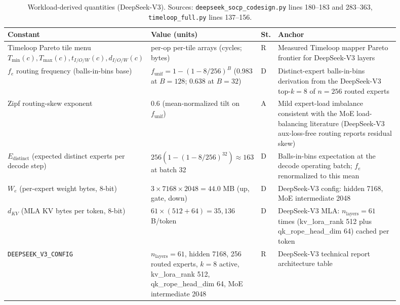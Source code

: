 \begin{table}[h]
\centering
\footnotesize
\begin{tabular}{@{}p{0.26\linewidth}p{0.17\linewidth}p{0.045\linewidth}p{0.42\linewidth}@{}}
\toprule
Constant & Value (units) & St. & Anchor \\
\midrule
Timeloop Pareto tile menu $T_{\min}(c), T_{\max}(c), t_{I/O/W}(c), d_{I/O/W}(c)$ & per-op per-tile arrays (cycles; bytes) & R & Measured Timeloop mapper Pareto frontier for DeepSeek-V3 layers \citep{timeloop} \\
$f_e$ routing frequency (balls-in-bins base) & $f_{\mathrm{unif}} = 1-(1-8/256)^{B}$ (0.983 at $B{=}128$; 0.638 at $B{=}32$) & D & Distinct-expert balls-in-bins derivation from the DeepSeek-V3 top-$k{=}8$ of $n{=}256$ routed experts \citep{deepseekv3report} \\
Zipf routing-skew exponent & 0.6 (mean-normalized tilt on $f_{\mathrm{unif}}$) & A & Mild expert-load imbalance consistent with the MoE load-balancing literature (DeepSeek-V3 aux-loss-free routing reports residual skew) \citep{deepseekv3report} \\
$E_{\mathrm{distinct}}$ (expected distinct experts per decode step) & $256(1-(1-8/256)^{32}) \approx 163$ at batch 32 & D & Balls-in-bins expectation at the decode operating batch; $f_e$ renormalized to this mean \citep{deepseekv3report} \\
$W_e$ (per-expert weight bytes, 8-bit) & $3 \times 7168 \times 2048 = 44.0$ MB (up, gate, down) & D & DeepSeek-V3 config: hidden 7168, MoE intermediate 2048 \citep{deepseekv3report} \\
$d_{KV}$ (MLA KV bytes per token, 8-bit) & $61 \times (512+64) = 35{,}136$ B/token & D & DeepSeek-V3 MLA: $n_{\mathrm{layers}} = 61$ times (kv\_lora\_rank 512 plus qk\_rope\_head\_dim 64) cached per token \citep{deepseekv3report} \\
\texttt{DEEPSEEK\_V3\_CONFIG} & $n_{\mathrm{layers}}{=}61$, hidden 7168, 256 routed experts, $k{=}8$ active, kv\_lora\_rank 512, qk\_rope\_head\_dim 64, MoE intermediate 2048 & R & DeepSeek-V3 technical report architecture table \citep{deepseekv3report} \\
\bottomrule
\end{tabular}
\caption{Workload-derived quantities (DeepSeek-V3). Sources: \texttt{deepseek\_socp\_codesign.py} lines 180--183 and 283--363, \texttt{timeloop\_full.py} lines 137--156.}
\label{tab:coeff_workload}
\end{table}

